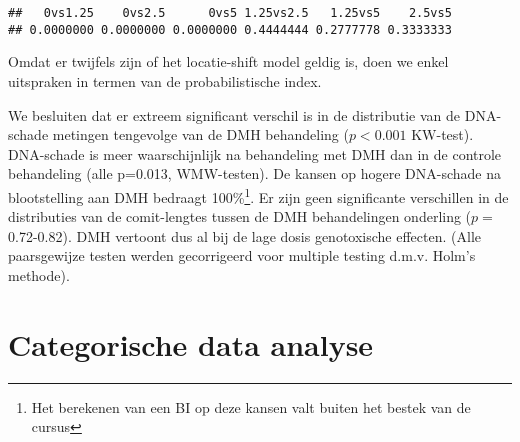 \documentclass[12pt,dutch,coursenotes]{book}
\newenvironment{Shaded}{\begin{snugshade}}{\end{snugshade}}
\newcommand{\KeywordTok}[1]{\textcolor[rgb]{0.13,0.29,0.53}{\textbf{#1}}}
\newcommand{\DataTypeTok}[1]{\textcolor[rgb]{0.13,0.29,0.53}{#1}}
\newcommand{\DecValTok}[1]{\textcolor[rgb]{0.00,0.00,0.81}{#1}}
\newcommand{\StringTok}[1]{\textcolor[rgb]{0.31,0.60,0.02}{#1}}
\newcommand{\ControlFlowTok}[1]{\textcolor[rgb]{0.13,0.29,0.53}{\textbf{#1}}}
\newcommand{\OperatorTok}[1]{\textcolor[rgb]{0.81,0.36,0.00}{\textbf{#1}}}
\newcommand{\NormalTok}[1]{#1}
\let\rmarkdownfootnote\footnote%
\def\footnote{\protect\rmarkdownfootnote}
\theoremstyle{definition}
\theoremstyle{definition}
\theoremstyle{definition}
\theoremstyle{remark}
\begin{document}
\begin{Shaded}
\end{Shaded}

\begin{verbatim}
##   0vs1.25    0vs2.5      0vs5 1.25vs2.5   1.25vs5    2.5vs5 
## 0.0000000 0.0000000 0.0000000 0.4444444 0.2777778 0.3333333
\end{verbatim}

Omdat er twijfels zijn of het locatie-shift model geldig is, doen we
enkel uitspraken in termen van de probabilistische index.

We besluiten dat er extreem significant verschil is in de distributie
van de DNA-schade metingen tengevolge van de DMH behandeling
(\(p<0.001\) KW-test). DNA-schade is meer waarschijnlijk na behandeling
met DMH dan in de controle behandeling (alle p=0.013, WMW-testen). De
kansen op hogere DNA-schade na blootstelling aan DMH bedraagt
100\%\footnote{Het berekenen van een BI op deze kansen valt buiten het
  bestek van de cursus}. Er zijn geen significante verschillen in de
distributies van de comit-lengtes tussen de DMH behandelingen onderling
(\(p=\) 0.72-0.82). DMH vertoont dus al bij de lage dosis genotoxische
effecten. (Alle paarsgewijze testen werden gecorrigeerd voor multiple
testing d.m.v. Holm's methode).

\chapter{Categorische data analyse}\label{chap:categorisch}
\end{document}
